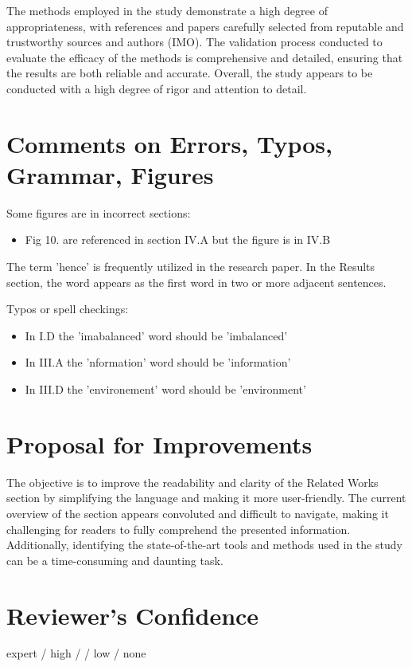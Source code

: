 \documentclass[a4paper,12pt]{article}
\begin{document}
The methods employed in the study demonstrate a high degree of appropriateness, with references and papers carefully selected from reputable and trustworthy sources and authors (IMO). The validation process conducted to evaluate the efficacy of the methods is comprehensive and detailed, ensuring that the results are both reliable and accurate. Overall, the study appears to be conducted with a high degree of rigor and attention to detail.


\section{Comments on Errors, Typos, Grammar, Figures}

Some figures are in incorrect sections:
\begin{itemize}
\item Fig 10. are referenced in section IV.A but the figure is in IV.B
\end{itemize}

The term 'hence' is frequently utilized in the research paper. In the Results section, the word appears as the first word in two or more adjacent sentences.

Typos or spell checkings:
\begin{itemize}
\item In I.D the 'imabalanced' word should be 'imbalanced'
\item In III.A the 'nformation' word should be 'information'
\item In III.D the 'environement' word should be 'environment'
\end{itemize}


\section{Proposal for Improvements}

The objective is to improve the readability and clarity of the Related Works section by simplifying the language and making it more user-friendly. The current overview of the section appears convoluted and difficult to navigate, making it challenging for readers to fully comprehend the presented information. Additionally, identifying the state-of-the-art tools and methods used in the study can be a time-consuming and daunting task.


\section{Reviewer's Confidence}

expert / high /  / low / none




\end{document}
